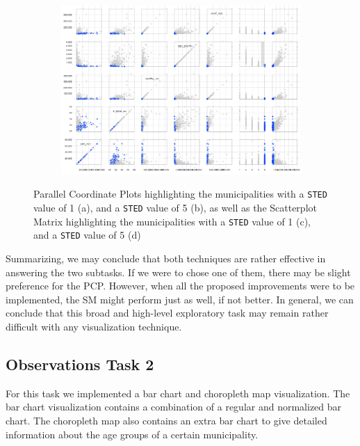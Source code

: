 \begin{figure}[h!]
\begin{subfigure}[t]{0.48\textwidth}
        \caption{ }
    \end{subfigure}
    \begin{subfigure}[t]{0.48\textwidth}
        \includegraphics[width=\textwidth]{img/sm_STED5.png}
        \caption{ }
    \end{subfigure}
    \caption{Parallel Coordinate Plots highlighting the municipalities with a \texttt{STED} value of 1 (a), and a \texttt{STED} value of 5 (b), as well as the Scatterplot Matrix highlighting the municipalities with a \texttt{STED} value of 1 (c), and a \texttt{STED} value of 5 (d)}
    \label{fig:sted}
\end{figure}

Summarizing, we may conclude that both techniques are rather effective in answering the two subtasks. If we were to chose one of them, there may be  slight preference for the PCP. However, when all the proposed improvements were to be implemented, the SM might perform just as well, if not better. In general, we can conclude that this broad and high-level exploratory task may remain rather difficult with any visualization technique.

\newpage

\subsection{Observations Task 2}
For this task we implemented a bar chart and choropleth map visualization. The bar chart visualization contains a combination of a regular and normalized bar chart. The choropleth map also contains an extra bar chart to give detailed information about the age groups of a certain municipality.

